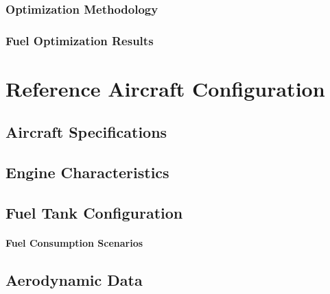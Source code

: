 \documentclass[12pt, a4paper]{report}
\begin{document}
\subsubsection{Optimization Methodology}



\subsubsection{Fuel Optimization Results}


\section{Reference Aircraft Configuration}

\subsection{Aircraft Specifications }


\subsection{Engine Characteristics}


\subsection{Fuel Tank Configuration}


\paragraph{Fuel Consumption Scenarios}


\subsection{Aerodynamic Data}


\end{document}
